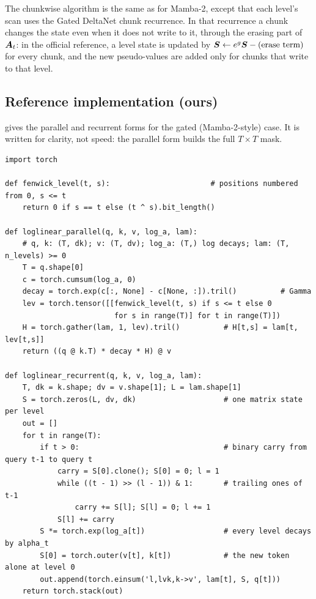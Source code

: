 The chunkwise algorithm is the same as for Mamba-2, except that each level's scan uses the
Gated DeltaNet chunk recurrence. In that recurrence a chunk changes the state even when it
does not write to it, through the erasing part of $\bm{A}_t$: in the official reference, a level
state is updated by $\bm{S} \gets e^{g}\bm{S} - (\text{erase term})$ for every chunk, and the new
pseudo-values are added only for chunks that write to that level.

\subsection{Reference implementation (ours)}

 gives the parallel and recurrent forms for the gated (Mamba-2-style) case.
It is written for clarity, not speed: the parallel form builds the full $T\times T$ mask.

\begin{lstlisting}[caption={Reference implementation (ours): log-linear attention, parallel and recurrent forms.},label={lst:c07-ll}]
import torch

def fenwick_level(t, s):                       # positions numbered from 0, s <= t
    return 0 if s == t else (t ^ s).bit_length()

def loglinear_parallel(q, k, v, log_a, lam):
    # q, k: (T, dk); v: (T, dv); log_a: (T,) log decays; lam: (T, n_levels) >= 0
    T = q.shape[0]
    c = torch.cumsum(log_a, 0)
    decay = torch.exp(c[:, None] - c[None, :]).tril()          # Gamma
    lev = torch.tensor([[fenwick_level(t, s) if s <= t else 0
                         for s in range(T)] for t in range(T)])
    H = torch.gather(lam, 1, lev).tril()          # H[t,s] = lam[t, lev[t,s]]
    return ((q @ k.T) * decay * H) @ v

def loglinear_recurrent(q, k, v, log_a, lam):
    T, dk = k.shape; dv = v.shape[1]; L = lam.shape[1]
    S = torch.zeros(L, dv, dk)                    # one matrix state per level
    out = []
    for t in range(T):
        if t > 0:                                 # binary carry from query t-1 to query t
            carry = S[0].clone(); S[0] = 0; l = 1
            while ((t - 1) >> (l - 1)) & 1:       # trailing ones of t-1
                carry += S[l]; S[l] = 0; l += 1
            S[l] += carry
        S *= torch.exp(log_a[t])                  # every level decays by alpha_t
        S[0] = torch.outer(v[t], k[t])            # the new token alone at level 0
        out.append(torch.einsum('l,lvk,k->v', lam[t], S, q[t]))
    return torch.stack(out)
\end{lstlisting}


